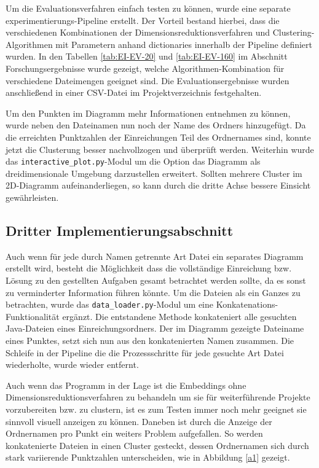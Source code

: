 Um die Evaluationsverfahren einfach testen zu können, wurde eine separate experimentierungs-Pipeline erstellt. Der Vorteil bestand hierbei, dass die verschiedenen Kombinationen der Dimensionsreduktionsverfahren und Clustering-Algorithmen mit Parametern anhand dictionaries innerhalb der Pipeline definiert wurden. In den Tabellen \ref{tab:EI-EV-20} und \ref{tab:EI-EV-160} im Abschnitt Forschungsergebnisse wurde gezeigt, welche Algorithmen-Kombination für verschiedene Dateimengen geeignet sind. Die Evaluationsergebnisse wurden anschließend in einer CSV-Datei im Projektverzeichnis festgehalten.

Um den Punkten im Diagramm mehr Informationen entnehmen zu können, wurde neben den Dateinamen nun noch der Name des Ordners hinzugefügt. Da die erreichten Punktzahlen der Einreichungen Teil des Ordnernames sind, konnte jetzt die Clusterung besser nachvollzogen und überprüft werden. Weiterhin wurde das \texttt{interactive\_plot.py}-Modul um die Option das Diagramm als dreidimensionale Umgebung darzustellen erweitert. Sollten mehrere Cluster im 2D-Diagramm aufeinanderliegen, so kann durch die dritte Achse bessere Einsicht gewährleisten.

\subsection{Dritter Implementierungsabschnitt}
Auch wenn für jede durch Namen getrennte Art Datei ein separates Diagramm erstellt wird, besteht die Möglichkeit dass die vollständige Einreichung bzw. Lösung zu den gestellten Aufgaben gesamt betrachtet werden sollte, da es sonst zu verminderter Information führen könnte. Um die Dateien als ein Ganzes zu betrachten, wurde das \texttt{data\_loader.py}-Modul um eine Konkatenations-Funktionalität ergänzt. Die entstandene Methode konkateniert alle gesuchten Java-Dateien eines Einreichungsordners. Der im Diagramm gezeigte Dateiname eines Punktes, setzt sich nun aus den konkatenierten Namen zusammen. Die Schleife in der Pipeline die die Prozessschritte für jede gesuchte Art Datei wiederholte, wurde wieder entfernt.

Auch wenn das Programm in der Lage ist die Embeddings ohne Dimensionsreduktionsverfahren zu behandeln um sie für weiterführende Projekte vorzubereiten bzw. zu clustern, ist es zum Testen immer noch mehr geeignet sie sinnvoll visuell anzeigen zu können. Daneben ist durch die Anzeige der Ordnernamen pro Punkt ein weiters Problem aufgefallen. So werden konkatenierte Dateien in einen Cluster gesteckt, dessen Ordnernamen sich durch stark variierende Punktzahlen unterscheiden, wie in Abbildung \ref{a1} gezeigt.